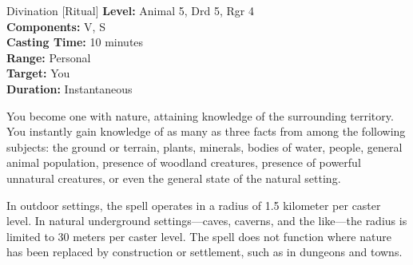 {Divination [Ritual]}
{
	\textbf{Level:}
	Animal 5, Drd 5, Rgr 4\\
	\textbf{Components:}
	V, S\\
	\textbf{Casting Time:}
	10 minutes\\
	\textbf{Range:}
	Personal\\
	\textbf{Target:}
	You\\
	\textbf{Duration:}
	Instantaneous\\
}
{
	You become one with nature, attaining knowledge of the surrounding territory. You instantly gain knowledge of as many as three facts from among the following subjects: the ground or terrain, plants, minerals, bodies of water, people, general animal population, presence of woodland creatures, presence of powerful unnatural creatures, or even the general state of the natural setting.

	In outdoor settings, the spell operates in a radius of 1.5 kilometer per caster level. In natural underground settings---caves, caverns, and the like---the radius is limited to 30 meters per caster level. The spell does not function where nature has been replaced by construction or settlement, such as in dungeons and towns.

}
